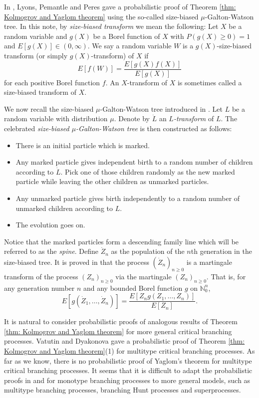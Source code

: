 \documentclass[12pt,a4paper]{amsart}
\numberwithin{equation}{section}
\begin{document}
	In \cite{lyons1995conceptual}, Lyons, Pemantle and Peres gave a probabilistic proof of Theorem \ref{thm: Kolmogrov and Yaglom theorem} using the so-called size-biased $\mu$-Galton-Watson tree.
	In this note, by \emph{size-biased transform} we mean the following:
	Let $X$ be a random variable
	and $g(X)$ be a Borel function of $X$ with $P(g(X) \geq 0) = 1$ and $E[g(X)]\in (0,\infty)$.
	We say a random variable $W$ is
	a $g(X)$-size-biased transform (or simply $g(X)$-transform) of $X$ if
\[
	E[f( W )] 
	= \frac{ E[g(X)f(X)]}{E[g(X)]}
\]
	for each positive Borel function $f$.
	An $X$-transform of $X$ is sometimes called a size-biased transform of $X$.

	We now recall the size-biased $\mu$-Galton-Watson tree introduced in \cite{lyons1995conceptual}.
	Let $L$ be a random variable with distribution $\mu$.
   Denote by $\dot L$ an \emph{$L$-transform} of $L$.
	The celebrated \emph{size-biased $\mu$-Galton-Watson tree} is then constructed as follows:
\begin{itemize}
\item
	There is an initial particle which is marked.
\item
	Any marked particle gives independent birth to a random number of children according to $\dot L$. Pick one of those children randomly as the new marked particle while leaving the other children as unmarked particles.
\item
	Any unmarked particle gives 
birth independently to a random number of unmarked children according to $L$.
\item
	The evolution goes on.
\end{itemize}

	Notice that the marked particles form a descending family line which will be referred to as the \emph{spine}.
	Define $\dot Z_n$ as the population of the $n$th generation in the size-biased tree.
	It is proved in \cite{lyons1995conceptual} that the process $(\dot Z_n)_{n\ge 0}$ is a martingale transform of the process $(Z_n)_{n\ge 0}$ via the martingale $(Z_n)_{n\ge 0}.$
	That is, for any generation number $n$ and any bounded Borel function $g$ on $\mathbb N_0^{n}$,
\begin{equation}
\label{eq:htransformation}
	E [ g ( \dot Z_1, \dots, \dot Z_n) ]
	= \frac { E[ Z_n g( Z_1, \dots, Z_n)]} {E [ Z_n]}.
\end{equation}

	It is natural to consider probabilistic proofs of analogous results of Theorem \ref{thm: Kolmogrov and Yaglom theorem} for more general critical branching processes.
	Vatutin and  Dyakonova \cite{VD} gave a probabilistic proof of Theorem \ref{thm: Kolmogrov and Yaglom theorem}(1) for multitype critical branching processes.
	As far as we know, there is no probabilistic proof of Yaglom's theorem for multitype critical branching processes.
	It seems that it is difficult to adapt the probabilistic proofs in \cite{geiger2000new} and \cite{lyons1995conceptual} for monotype branching processes to more general models, such as multitype branching processes, branching Hunt processes and superprocesses.
\end{document}
